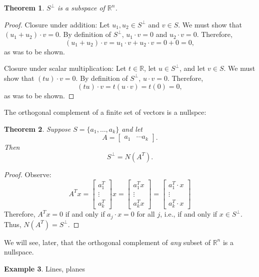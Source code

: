 \documentclass{amsart}
\newcommand{\RR}{\mathbb{R}}
\newtheorem{theorem}{Theorem}[section]
\theoremstyle{definition}
\newtheorem{example}[theorem]{Example}
\begin{document}
\begin{theorem}
  $S^\perp$ is a subspace of $\RR^n$.
\end{theorem}

\begin{proof}
  Closure under addition: Let $u_1, u_2\in S^\perp$ and $v\in S$.
  We must show that $(u_1+u_2)\cdot v=0$.
  By definition of $S^\perp$, $u_1\cdot v=0$ and $u_2\cdot v = 0$.
  Therefore,
    \[
    (u_1+u_2)\cdot v=u_1\cdot v + u_2\cdot v = 0 + 0 = 0,
  \]
  as was to be shown.

  Closure under scalar multiplication: Let $t\in \RR$, let $u\in S^\perp$, and let $v\in S$.
  We must show that $(tu)\cdot v=0$. By definition of $S^\perp$, $u\cdot v = 0$.
  Therefore,
  \[
    (tu)\cdot v=t (u\cdot v)  = t(0) = 0,
  \]
  as was to be shown.

\end{proof}

The orthogonal complement of a finite set of vectors is a nullspce:
\begin{theorem}
Suppose $S=\{a_1,\ldots,a_k\}$ and let $$A=\begin{bmatrix}a_1&\cdots a_k\end{bmatrix}.$$
Then 
$$S^\perp = N(A^T).$$
\end{theorem}

\begin{proof} Observe:
$$A^Tx=
\begin{bmatrix}a_1^T\\\vdots\\a_k^T\end{bmatrix}x
=\begin{bmatrix}a_1^Tx\\\vdots\\a_k^Tx\end{bmatrix}
=\begin{bmatrix}a_1^T\cdot x\\\vdots\\a_k^T\cdot x\end{bmatrix}$$
  Therefore, $A^Tx=0$ if and only if $a_j\cdot x=0$ for all $j$, i.e., if and only if $x\in S^\perp$.
  Thus, $N(A^T) = S^\perp$.
\end{proof}

We will see, later, that the orthogonal complement of \emph{any} subset of $\RR^n$ is a nullspace.

\begin{example}
  Lines, planes
\end{example}
\end{document}
